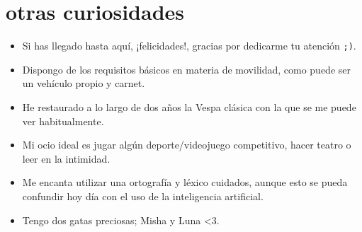 \documentclass[]{twentysecondcv}
\begin{document}
\section{otras curiosidades}
  \begin{itemize}
    \item Si has llegado hasta aquí, ¡felicidades!, gracias por dedicarme tu atención \texttt{;)}.
    \item Dispongo de los requisitos básicos en materia de movilidad, como puede ser un vehículo propio y carnet. 
    \item He restaurado a lo largo de dos años la Vespa clásica con la que se me puede ver habitualmente.
    \item Mi ocio ideal es jugar algún deporte/videojuego competitivo, hacer teatro o leer en la intimidad.
    \item Me encanta utilizar una ortografía y léxico cuidados, aunque esto se pueda confundir hoy día con el uso de la inteligencia artificial.
    \item Tengo dos gatas preciosas; Misha y Luna <3.
  \end{itemize}
  

\end{document}
